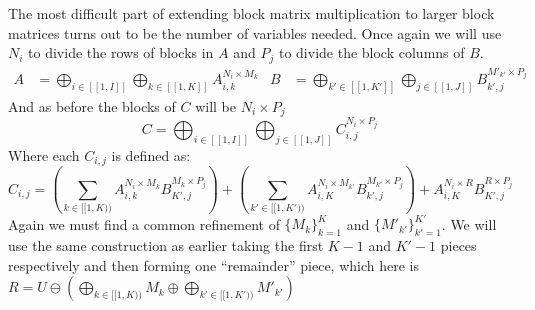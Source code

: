The most difficult part of extending block matrix multiplication to larger block matrices turns out to be the number of 
variables needed.
Once again we will use $N_i$ to divide the rows of blocks in $A$ and $P_j$ to divide the block columns of $B$.
\begin{align*}
	A &= \bigoplus_{i \in [\![1,I]\!]} \bigoplus_{k \in [\![1,K]\!]} A_{i,k}^{N_i \times M_k}&
	B &= \bigoplus_{k' \in [\![1,K']\!]} \bigoplus_{j \in [\![1,J]\!]} B_{k',j}^{M'_{k'} \times P_j}
\end{align*}
And as before the blocks of $C$ will be $N_i \times P_j$
\begin{equation}
	C = \bigoplus_{i \in [\![1,I]\!]} \bigoplus_{j \in [\![1,J]\!]} C_{i,j}^{N_i \times P_j}
\end{equation}
Where each $C_{i,j}$ is defined as:
\begin{equation}
	C_{i,j} = 	\left(\sum_{k \in [\![1,K)\!)} A_{i,k}^{N_i \times M_k} B_{K',j}^{M_k \times P_j} \right)+ 
				\left(\sum_{k' \in [\![1,K')\!)} A_{i,K}^{N_i \times M_{k'}} B_{k',j}^{M_{k'} \times P_j} \right)+ 
				A_{i,K}^{N_i \times R} B_{K',j}^{R \times P_j}
\end{equation}
Again we must find a common refinement of $\{M_k\}_{k=1}^K$ and $\{M'_{k'}\}_{k'=1}^{K'}$.
We will use the same construction as earlier taking the first $K-1$ and $K'-1$ pieces respectively and then forming one 
``remainder'' piece, which here is 
$R =U \ominus \left( \bigoplus_{k \in [\![1,K)\!)} M_k \oplus \bigoplus_{k' \in [\![1,K')\!)} M'_{k'}\right)$





